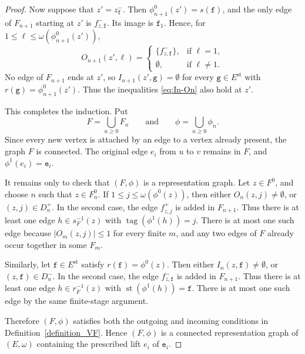 \documentclass[10pt,a4paper]{amsart}
\begin{document}
\begin{proof}
Now suppose that $z'=z_{\mathtt{f}}^-$. Then $\phi_{n+1}^0(z')=s(\mathtt{f})$, and the only edge of $F_{n+1}$ starting at $z'$ is $f_{z,\mathtt{f}}^-$. Its image is $\mathtt{f}_1$. Hence, for $1\leq \ell\leq \omega(\phi_{n+1}^0(z'))$,
$$
O_{n+1}(z',\ell)=
\begin{cases}
\{f_{z,\mathtt{f}}^-\},&\text{if }\ell=1,\\
\emptyset,&\text{if }\ell\neq 1.
\end{cases}
$$
No edge of $F_{n+1}$ ends at $z'$, so $I_{n+1}(z',\mathtt{g})=\emptyset$ for every $\mathtt{g}\in E^{\mathrm{st}}$ with $r(\mathtt{g})=\phi_{n+1}^0(z')$. Thus the inequalities \eqref{eq:In-On} also hold at $z'$.

This completes the induction. Put
$$
F=\bigcup_{n\geq 0}F_n\qquad\text{and}\qquad
\phi=\bigcup_{n\geq 0}\phi_n.
$$
Since every new vertex is attached by an edge to a vertex already present, the graph $F$ is connected. The original edge $e_i$ from $u$ to $v$ remains in $F$, and $\phi^1(e_i)=\mathtt{e}_i$.

It remains only to check that $(F,\phi)$ is a representation graph. Let $z\in F^0$, and choose $n$ such that $z\in F_n^0$. If $1\leq j\leq \omega(\phi^0(z))$, then either $O_n(z,j)\neq\emptyset$, or $(z,j)\in D_n^+$. In the second case, the edge $f_{z,j}^+$ is added in $F_{n+1}$. Thus there is at least one edge $h\in s_F^{-1}(z)$ with $\operatorname{tag}(\phi^1(h))=j$. There is at most one such edge because $|O_m(z,j)|\leq 1$ for every finite $m$, and any two edges of $F$ already occur together in some $F_m$.

Similarly, let $\mathtt{f}\in E^{\mathrm{st}}$ satisfy $r(\mathtt{f})=\phi^0(z)$. Then either $I_n(z,\mathtt{f})\neq\emptyset$, or $(z,\mathtt{f})\in D_n^-$. In the second case, the edge $f_{z,\mathtt{f}}^-$ is added in $F_{n+1}$. Thus there is at least one edge $h\in r_F^{-1}(z)$ with $\operatorname{st}(\phi^1(h))=\mathtt{f}$. There is at most one such edge by the same finite-stage argument.

Therefore $(F,\phi)$ satisfies both the outgoing and incoming conditions in Definition~\ref{definition_VF}. Hence $(F,\phi)$ is a connected representation graph of $(E,\omega)$ containing the prescribed lift $e_i$ of $\mathtt{e}_i$.
\end{proof}
\end{document}
